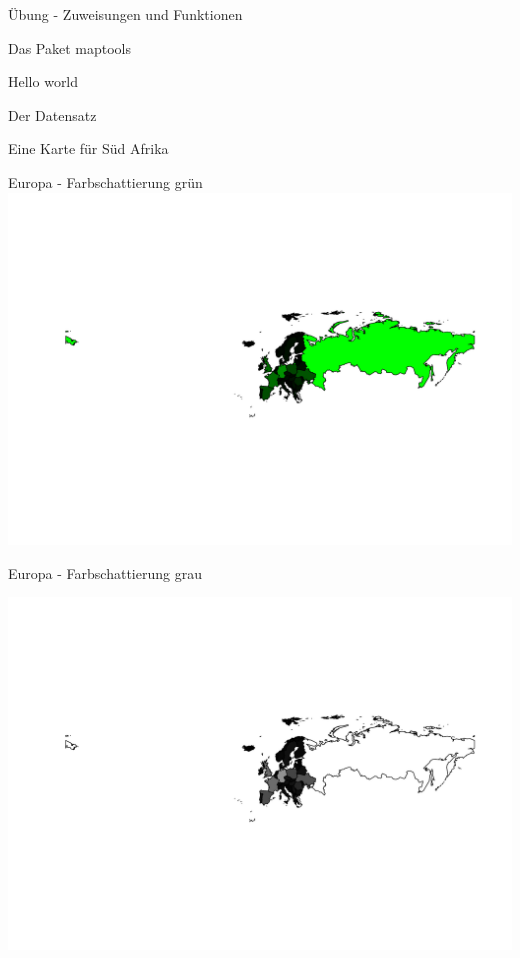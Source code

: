 \documentclass[ignorenonframetext,]{beamer}
\newenvironment{Shaded}{\begin{snugshade}}{\end{snugshade}}
\newcommand{\DataTypeTok}[1]{\textcolor[rgb]{0.74,0.68,0.62}{\underline{#1}}}
\newcommand{\KeywordTok}[1]{\textcolor[rgb]{0.26,0.66,0.93}{\textbf{#1}}}
\newcommand{\NormalTok}[1]{\textcolor[rgb]{0.74,0.68,0.62}{#1}}
\newcommand{\OperatorTok}[1]{\textcolor[rgb]{0.74,0.68,0.62}{#1}}
\newcommand{\StringTok}[1]{\textcolor[rgb]{0.02,0.61,0.04}{#1}}
\begin{document}
\begin{frame}[fragile]{Übung - Zuweisungen und Funktionen}
\begin{frame}[fragile]{Das Paket maptools}
\begin{frame}[fragile]{Hello world}
\begin{frame}[fragile]{Der Datensatz}
\begin{frame}[fragile]{Eine Karte für Süd Afrika}
\begin{frame}[fragile]{Europa - Farbschattierung grün}
\includegraphics{Geomedizin_files/figure-beamer/unnamed-chunk-81-1.pdf}

\end{frame}

\begin{frame}[fragile]{Europa - Farbschattierung grau}
\protect\hypertarget{europa---farbschattierung-grau}{}

\begin{Shaded}
\end{Shaded}

\includegraphics{Geomedizin_files/figure-beamer/unnamed-chunk-82-1.pdf}


\end{frame}
\end{frame}
\end{frame}
\end{frame}
\end{frame}
\end{frame}
\end{document}

